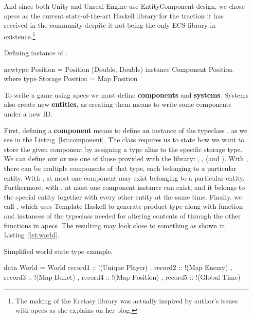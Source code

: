 \documentclass[
  digital, %
  color,   %
  table,   %
  oneside, %
  lof,     %
  lot,     %
]{fithesis3}
\begin{document}
And since both Unity and Unreal Engine use Entity\textendash{}Component design,
we chose apecs as the current state-of-the-art Haskell library
for the traction it has received in the community despite
it not being the only ECS library in existence.\footnote{
The making of the Ecstasy library was actually inspired by
author's issues with apecs as she explains on her blog.\cite{whyecstasy}
}

\begin{listing}[H]
\caption{Defining instance of .}
\begin{haskell}
newtype Position = Position (Double, Double)
instance Component Position where
    type Storage Position = Map Position
\end{haskell}
\label{lst:component}
\end{listing}

To write a game using apecs we must define \textbf{components} and \textbf{systems}.
Systems also create new \textbf{entities},
as creating them means to write some components under a new ID.

First, defining a \textbf{component} means to define an instance of the typeclass
, as we see in the Listing~\ref{lst:component}.
The  class
requires us to state how we want to store the given component
by assigning a type alias to the specific storage type.
We can define our  or use one of those provided
with the library: , ,  (and ).
With , there can be multiple components of that type,
each belonging to a particular entity.
With , at most one component may exist
belonging to a particular entity. Furthermore,
with , at most one component instance can exist,
and it belongs to the special  entity together
with every other entity at the same time. Finally, we call ,
which uses Template Haskell to generate  product type
along with  function and instances of the 
typeclass needed for altering contents of  through
the other functions in apecs. The resulting 
may look close to something as shown in Listing~\ref{lst:world}.

\begin{listing}[H]
\caption{Simplified world state type example.}
\begin{haskell}
data World =
    World
    { record1 :: !(Unique Player)
    , record2 :: !(Map Enemy)
    , record3 :: !(Map Bullet)
    , record4 :: !(Map Position)
    , record5 :: !(Global Time)
    }
\end{haskell}
\label{lst:world}
\end{listing}
\end{document}
